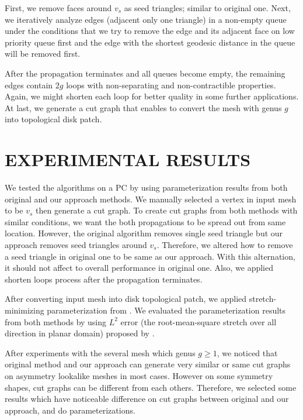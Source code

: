 \documentclass[a4paper,twoside]{article}
\begin{document}
First, we remove faces around $v_s$ as seed triangles; similar to original one. Next, we iteratively analyze edges (adjacent only one triangle) in a non-empty queue under the conditions that we try to remove the edge and its adjacent face on low priority queue first and the edge with the shortest geodesic distance in the queue will be removed first.

After the propagation terminates and all queues become empty, the remaining edges contain $2g$ loops with non-separating and non-contractible properties. Again, we might shorten each loop for better quality in some further applications. At last, we generate a cut graph that enables to convert the mesh with genus $g$ into topological disk patch.


\section{\uppercase{Experimental Results}}
\label{sec:Experiment Results}
\noindent We tested the algorithms on a PC by using parameterization results from both original and our approach methods. We manually selected a vertex in input mesh to be $v_s$ then generate a cut graph. To create cut graphs from both methods with similar conditions, we want the both propagations to be spread out from same location. However, the original algorithm removes single seed triangle but our approach removes seed triangles around $v_s$. Therefore, we altered how to remove a seed triangle in original one to be same as our approach. With this alternation, it should not affect to overall performance in original one. Also, we applied shorten loops process after the propagation terminates.

After converting input mesh into disk topological patch, we applied stretch-minimizing parameterization from \cite{Yoshizawa_SMI04}.  We evaluated the parameterization results from both methods by using $L^2$ error (the root-mean-square stretch over all direction in planar domain) proposed by \cite{Sander:2001:TMP:383259.383307,Sander:2002:SP:581896.581909}.  

After experiments with the several mesh which genus $g \geq 1$, we noticed that original method and our approach can generate very similar or same cut graphs on asymmetry lookalike meshes in most cases. However on some symmetry shapes, cut graphs can be different from each others. Therefore, we selected some results which have noticeable difference on cut graphs between original and our approach, and do parameterizations.
\end{document}
